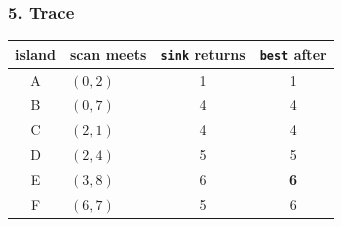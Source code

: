 \subsubsection*{5. Trace}

\begin{tracebox}
\begin{center}
\small
\begin{tabular}{@{}clcc@{}}
\toprule
\textbf{island} & \textbf{scan meets} & \textbf{\texttt{sink} returns} & \textbf{\texttt{best} after} \\
\midrule
A & $(0,2)$ & 1 & 1 \\
B & $(0,7)$ & 4 & 4 \\
C & $(2,1)$ & 4 & 4 \\
D & $(2,4)$ & 5 & 5 \\
E & $(3,8)$ & 6 & \textbf{6} \\
F & $(6,7)$ & 5 & 6 \\
\bottomrule
\end{tabular}
\end{center}


\end{tracebox}
